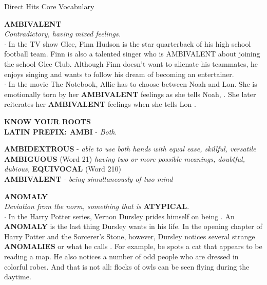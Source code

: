 \documentclass{exam}
\begin{document}
\begin{center}
\begin{huge}
Direct Hits Core Vocabulary
\end{huge}
\end{center}
\begin{questions}
\question  \textbf{AMBIVALENT}\\
\textit{Contradictory, having mixed feelings.}\\

$\cdot$ In the TV show Glee, Finn Hudson is the star
quarterback of his high school football team. Finn is
also a talented singer who is AMBIVALENT about
joining the school Glee Club. Although Finn doesn't
want to alienate his teammates, he enjoys singing and
wants to follow his dream of becoming an entertainer.\\

$\cdot$ In the movie The Notebook, Allie has to choose
between Noah and Lon. She is emotionally torn by her
\textbf{AMBIVALENT} feelings as she tells Noah, .
She later reiterates her \textbf{AMBIVALENT} feelings when
she tells Lon .

\begin{tcolorbox}
\begin{center}
\textbf{ KNOW YOUR ROOTS}\\
\textbf{LATIN PREFIX: AMBI } - \textit{Both}.\\  
\end{center}  
\textbf{AMBIDEXTROUS} - \textit{able to use both hands with equal ease, skillful, versatile}\\
\textbf{AMBIGUOUS} (Word 21) \textit{having two or more possible meanings, doubtful, dubious,} \textbf{ EQUIVOCAL} (Word 210)\\
\textbf{AMBIVALENT} - \textit{ being simultaneously of two mind}
\end{tcolorbox}

\question  \textbf{ANOMALY}\\ \textit{Deviation from the norm, something that is}
\textbf{ATYPICAL}.\\

$\cdot$ In the Harry Potter series, Vernon Dursley prides
himself on being . An \textbf{ANOMALY} is the last thing Dursley wants
in his life. In the opening chapter of Harry Potter and
the Sorcerer's Stone, however, Dursley notices several
strange \textbf{ANOMALIES} or what he calls .
For example, be spots a cat that appears to be reading
a map. He also notices a number of odd people who
are dressed in colorful robes. And that is not all: flocks
of owls can be seen flying during the daytime.


\end{questions}
\end{document}
